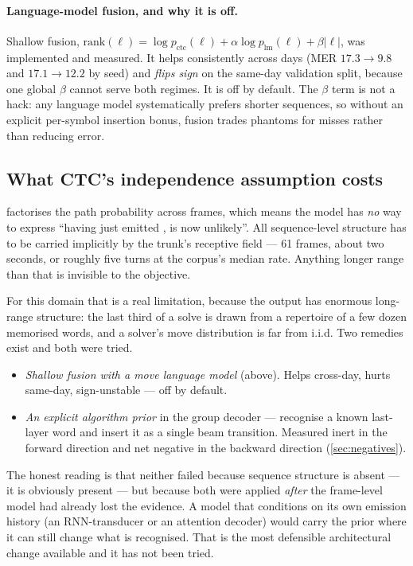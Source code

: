 \paragraph{Language-model fusion, and why it is off.} Shallow fusion,
$\mathrm{rank}(\ell) = \log p_{\text{ctc}}(\ell) + \alpha \log
p_{\text{lm}}(\ell) + \beta|\ell|$, was implemented and measured. It helps
consistently across days (MER $17.3\to9.8$ and $17.1\to12.2$ by seed) and
\emph{flips sign} on the same-day validation split, because one global
$\beta$ cannot serve both regimes. It is off by default. The $\beta$ term is
not a hack: any language model systematically prefers shorter sequences, so
without an explicit per-symbol insertion bonus, fusion trades phantoms for
misses rather than reducing error.

\subsection{What CTC's independence assumption costs}
\label{sec:ctc-limits}

 factorises the path probability across frames, which
means the model has \emph{no} way to express ``having just emitted
,  is now unlikely''. All sequence-level structure has to be
carried implicitly by the trunk's receptive field --- 61 frames, about two
seconds, or roughly five turns at the corpus's median rate. Anything longer
range than that is invisible to the objective.

For this domain that is a real limitation, because the output has enormous
long-range structure: the last third of a solve is drawn from a repertoire
of a few dozen memorised words, and a solver's move distribution is far from
i.i.d. Two remedies exist and both were tried.

\begin{itemize}[leftmargin=1.3em,itemsep=2pt]
\item \emph{Shallow fusion with a move language model} (above). Helps
cross-day, hurts same-day, sign-unstable --- off by default.
\item \emph{An explicit algorithm prior} in the group decoder --- recognise a
known last-layer word and insert it as a single beam transition. Measured
inert in the forward direction and net negative in the backward direction
(\cref{sec:negatives}).
\end{itemize}

The honest reading is that neither failed because sequence structure is
absent --- it is obviously present --- but because both were applied
\emph{after} the frame-level model had already lost the evidence. A model
that conditions on its own emission history (an RNN-transducer or an
attention decoder) would carry the prior where it can still change what is
recognised. That is the most defensible architectural change available and
it has not been tried.

